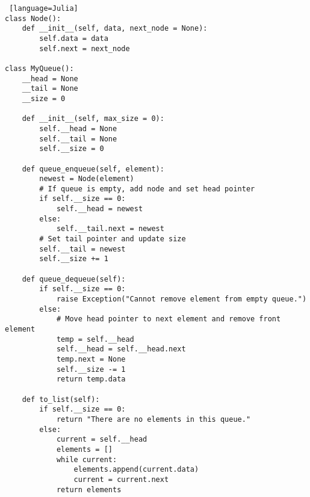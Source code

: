 \documentclass[12pt]{article}
\begin{document}
\begin{lstlisting} [language=Julia]
class Node():
    def __init__(self, data, next_node = None):
        self.data = data
        self.next = next_node

class MyQueue():
    __head = None
    __tail = None
    __size = 0

    def __init__(self, max_size = 0):
        self.__head = None
        self.__tail = None
        self.__size = 0

    def queue_enqueue(self, element):
        newest = Node(element)
        # If queue is empty, add node and set head pointer
        if self.__size == 0:
            self.__head = newest
        else:
            self.__tail.next = newest
        # Set tail pointer and update size
        self.__tail = newest
        self.__size += 1

    def queue_dequeue(self):
        if self.__size == 0:
            raise Exception("Cannot remove element from empty queue.")
        else:
            # Move head pointer to next element and remove front element
            temp = self.__head
            self.__head = self.__head.next
            temp.next = None
            self.__size -= 1
            return temp.data
    
    def to_list(self):
        if self.__size == 0:
            return "There are no elements in this queue."
        else:
            current = self.__head
            elements = []
            while current:
                elements.append(current.data)
                current = current.next
            return elements
            
\end{lstlisting}

\end{document}
